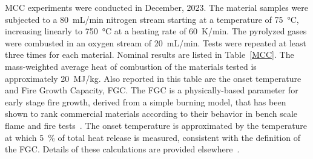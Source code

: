 MCC experiments were conducted in December, 2023. The material samples were subjected to a 80~mL/min nitrogen stream starting at a temperature of 75~°C, increasing linearly to 750~°C at a heating rate of 60~K/min. The pyrolyzed gases were combusted in an oxygen stream of 20~mL/min. Tests were repeated at least three times for each material. Nominal results are listed in Table~\ref{MCC}. The mass-weighted average heat of combustion of the materials tested is approximately 20~MJ/kg. Also reported in this table are the onset temperature and Fire Growth Capacity, FGC. The FGC is a physically-based parameter for early stage fire growth, derived from a simple burning model, that has been shown to rank commercial materials according to their behavior in bench scale flame and fire tests~\cite{lyon2021molecular}. The onset temperature is approximated by the temperature at which 5~\% of total heat release is measured, consistent with the definition of the FGC. Details of these calculations are provided elsewhere~\cite{DOT/FAA/TC-20/30, lyon2021molecular}.


